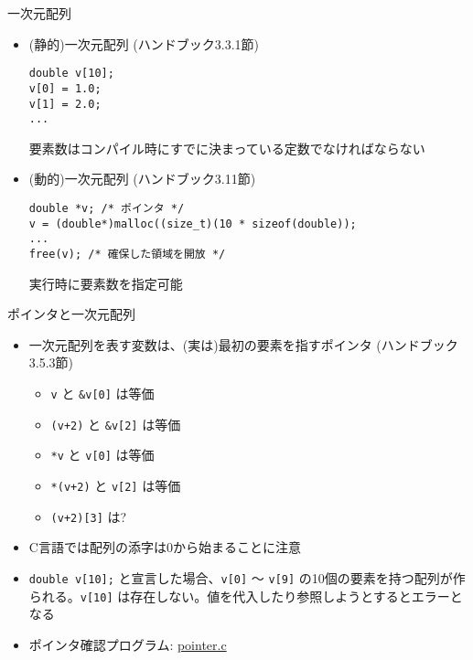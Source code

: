 \begin{frame}[t,fragile]{一次元配列}
  \begin{itemize}
    \setlength{\itemsep}{1em}
  \item (静的)一次元配列 (ハンドブック3.3.1節)
\begin{lstlisting}
double v[10];
v[0] = 1.0;
v[1] = 2.0;
...
\end{lstlisting}
    要素数はコンパイル時にすでに決まっている定数でなければならない
  \item (動的)一次元配列 (ハンドブック3.11節)
\begin{lstlisting}
double *v; /* ポインタ */
v = (double*)malloc((size_t)(10 * sizeof(double));
...
free(v); /* 確保した領域を開放 */
\end{lstlisting}
実行時に要素数を指定可能
  \end{itemize}
\end{frame}

\begin{frame}[t,fragile]{ポインタと一次元配列}
  \begin{itemize}
    \setlength{\itemsep}{1em}
  \item 一次元配列を表す変数は、(実は)最初の要素を指すポインタ  (ハンドブック3.5.3節)
    \begin{itemize}
    \item \verb+v+ と \verb+&v[0]+ は等価
    \item \verb^(v+2)^ と \verb^&v[2]^ は等価
    \item \verb+*v+ と \verb+v[0]+ は等価
    \item \verb^*(v+2)^ と \verb^v[2]^ は等価
    \item \verb^(v+2)[3]^ は?
    \end{itemize}
  \item C言語では配列の添字は0から始まることに注意
  \item \verb^double v[10];^ と宣言した場合、\verb^v[0]^ 〜 \verb^v[9]^ の10個の要素を持つ配列が作られる。\verb^v[10]^ は存在しない。値を代入したり参照しようとするとエラーとなる
  \item ポインタ確認プログラム: \href{https://github.com/todo-group/computer-experiments/blob/master/exercise/matrix/pointer.c}{pointer.c}
  \end{itemize}
\end{frame}


